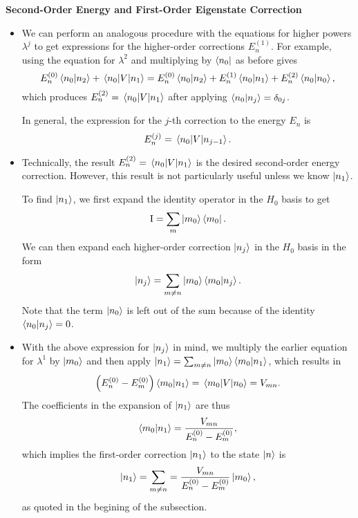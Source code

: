 \documentclass[11pt, a4paper]{article}
\newcommand{\II}{\operatorname{I}}  %
\begin{document}
\textbf{Second-Order Energy and First-Order Eigenstate Correction}
\begin{itemize}
     \item We can perform an analogous procedure with the equations for higher powers $ \lambda^{j} $ to get expressions for the higher-order corrections $ E_{n}^{(1)} $. For example, using the equation for $ \lambda^{2} $ and multiplying by $ \bra{n_{0}} $ as before gives
    \begin{equation*}
        E_{n}^{(0)} \braket{n_{0}}{n_{2}} + \mel{n_{0}}{V}{n_{1}} = E_{n}^{(0)}\braket{n_{0}}{n_{2}} + E_{n}^{(1)}\braket{n_{0}}{n_{1}} + E_{n}^{(2)}\braket{n_{0}}{n_{0}}, 
    \end{equation*}
    which produces $ E_{n}^{(2)} = \mel{n_{0}}{V}{n_{1}}$ after applying $ \braket{n_{0}}{n_{j}} = \delta_{0j} $. 

    In general, the expression for the $ j $-th correction to the energy $ E_{n} $ is
    \begin{equation*}
        E_{n}^{(j)} = \mel{n_{0}}{V}{n_{j-1}}.
    \end{equation*}
    
    \item Technically, the result $ E_{n}^{(2)} = \mel{n_{0}}{V}{n_{1}} $ is the desired second-order energy correction. However, this result is not particularly useful unless we know $ \ket{n_{1}} $.

    To find $ \ket{n_{1}} $, we first expand the identity operator in the $ H_{0} $ basis to get
    \begin{equation*}
        \II = \sum_{m}\ket{m_{0}}\bra{m_{0}}.
    \end{equation*}
    We can then expand each higher-order correction $ \ket{n_{j}} $ in the $ H_{0} $ basis in the form
    \begin{equation*}
        \ket{n_{j}} = \sum_{m \neq n}\ket{m_{0}}\braket{m_{0}}{n_{j}}.
    \end{equation*}
    Note that the term $ \ket{n_{0}} $ is left out of the sum because of the identity $ \braket{n_{0}}{n_{j}} = 0 $. 

    \item With the above expression for $ \ket{n_{j}} $ in mind, we multiply the earlier equation for $ \lambda^{1} $ by $ \ket{m_{0}} $ and then apply $ \ket{n_{1}} = \sum_{m \neq n}\ket{m_{0}}\braket{m_{0}}{n_{1}} $, which results in
    \begin{equation*}
        \left( E_{n}^{(0)} - E_{m}^{(0)} \right)\braket{m_{0}}{n_{1}} = \mel{m_{0}}{V}{n_{0}} = V_{mn}.
    \end{equation*}
    The coefficients in the expansion of $ \ket{n_{1}} $ are thus
    \begin{equation*}
        \braket{m_{0}}{n_{1}} = \frac{V_{mn}}{E_{n}^{(0)} - E_{m}^{(0)}},
    \end{equation*}
    which implies the first-order correction $ \ket{n_{1}} $ to the state $ \ket{n} $ is
    \begin{equation*}
        \ket{n_{1}} = \sum_{m\neq n} = \frac{V_{mn}}{E_{n}^{(0)} - E_{m}^{(0)}} \ket{m_{0}},
    \end{equation*}
    as quoted in the begining of the subsection.


\end{itemize}
\end{document}
